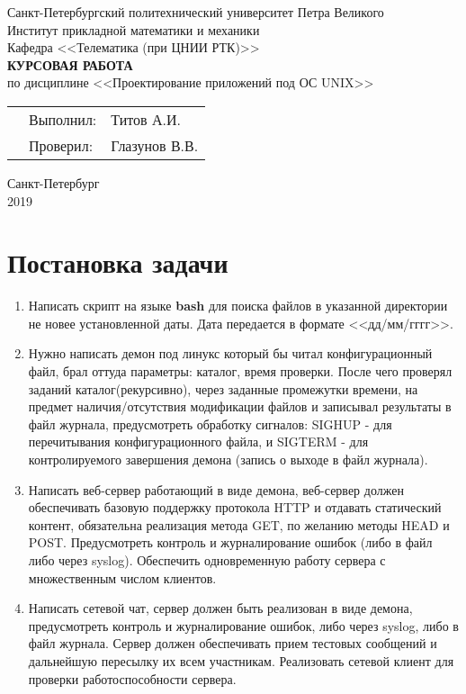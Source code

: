 \documentclass{article}
\begin{document}
    \thispagestyle{empty}
	\begin{center}
		Санкт-Петербургский политехнический университет Петра Великого\\
		Институт прикладной математики и механики\\
		Кафедра <<Телематика (при ЦНИИ РТК)>>\\
		\vspace{7cm}
		\textbf{\Large{КУРСОВАЯ РАБОТА}}\\
		\vspace{0.5cm}
		\large{по дисциплине <<Проектирование приложений под ОС UNIX>>\\}
	\end{center}
	\vspace{3cm}
	\begin{tabular} {l l l}
	\hspace{10cm} & Выполнил: & Титов А.И.\\
	& Проверил: & Глазунов В.В.
	\end{tabular}
	\vspace{7cm}
	\begin{center}
		Санкт-Петербург\\
		2019
    \end{center}


	\renewcommand\contentsname{Оглавление}
	\tableofcontents

	\newpage
	\section*{Постановка задачи}

	\begin{enumerate}
		\item Написать скрипт на языке \textbf{bash} для поиска файлов в указанной директории не новее установленной даты. Дата передается в формате <<дд/мм/гггг>>.
		\item Нужно написать демон под линукс который бы читал
		конфигурационный файл, брал оттуда параметры: каталог,
		время проверки. После чего проверял заданий
		каталог(рекурсивно), через заданные промежутки времени, на
		предмет наличия/отсутствия модификации файлов и
		записывал результаты в файл журнала, предусмотреть
		обработку сигналов: SIGHUP - для перечитывания
		конфигурационного файла, и SIGTERM - для контролируемого
		завершения демона (запись о выходе в файл журнала).
		\item Написать веб-сервер работающий в виде демона,
		веб-сервер должен обеспечивать базовую поддержку протокола
		HTTP и отдавать статический контент, обязательна реализация
		метода GET, по желанию методы HEAD и POST.
		Предусмотреть контроль и журналирование ошибок (либо в
		файл либо через syslog). Обеспечить одновременную работу
		сервера с множественным числом клиентов.
		\item Написать сетевой чат, сервер должен быть
		реализован в виде демона, предусмотреть контроль и
		журналирование ошибок, либо через syslog, либо в файл
		журнала. Сервер должен обеспечивать прием тестовых
		сообщений и дальнейшую пересылку их всем участникам.
		Реализовать сетевой клиент для проверки работоспособности
		сервера.
	\end{enumerate}
\end{document}
